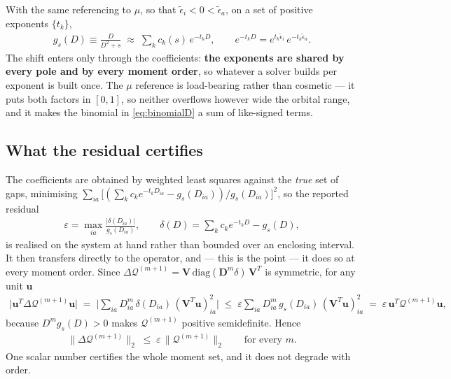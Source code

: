 \documentclass[11pt]{article}
\newcommand{\mat}[1]{{\mathbf{#1}}}
\newcommand{\Qcal}{\mathcal{Q}}
\newcommand{\eb}{\tilde{\epsilon}}
\begin{document}
With the same referencing to $\mu$, so that $\eb_i < 0 < \eb_a$, on a set of positive
exponents $\{t_k\}$,
\begin{align}
    g_s(D) \equiv \frac{D}{D^2+s} \; \approx \; \sum_k c_k(s)\, e^{-t_k D} ,
    \qquad
    e^{-t_k D} = e^{t_k \eb_i}\, e^{-t_k \eb_a} .
    \label{eq:expfit}
\end{align}
The shift enters only through the coefficients: \textbf{the exponents are shared by every
pole and by every moment order}, so whatever a solver builds per exponent is built once.
The $\mu$ reference is load-bearing rather than cosmetic --- it puts both factors in
$[0,1]$, so neither overflows however wide the orbital range, and it makes the binomial in
\eqref{eq:binomialD} a sum of like-signed terms.

\subsection{What the residual certifies}

The coefficients are obtained by weighted least squares against the \emph{true} set of gaps,
minimising $\sum_{ia} \big[(\sum_k c_k e^{-t_k D_{ia}} - g_s(D_{ia}))/g_s(D_{ia})\big]^2$, so
the reported residual
\begin{align}
    \varepsilon = \max_{ia} \frac{|\delta(D_{ia})|}{g_s(D_{ia})} ,
    \qquad
    \delta(D) = \sum_k c_k e^{-t_k D} - g_s(D) ,
\end{align}
is realised on the system at hand rather than bounded over an enclosing interval. It then
transfers directly to the operator, and --- this is the point --- it does so at every moment
order. Since $\Delta \Qcal^{(m+1)} = \mat{V}\,\mathrm{diag}(\mat{D}^m \delta)\,\mat{V}^T$ is
symmetric, for any unit $\mat{u}$
\begin{align}
    \big| \mat{u}^T \Delta \Qcal^{(m+1)} \mat{u} \big|
    \;=\; \Big| \sum_{ia} D_{ia}^m\, \delta(D_{ia})\, (\mat{V}^T\mat{u})_{ia}^2 \Big|
    \;\le\; \varepsilon \sum_{ia} D_{ia}^m\, g_s(D_{ia})\, (\mat{V}^T\mat{u})_{ia}^2
    \;=\; \varepsilon\, \mat{u}^T \Qcal^{(m+1)} \mat{u} ,
\end{align}
because $D^m g_s(D) > 0$ makes $\Qcal^{(m+1)}$ positive semidefinite. Hence
\begin{align}
    \big\| \Delta \Qcal^{(m+1)} \big\|_2 \;\le\; \varepsilon\, \big\| \Qcal^{(m+1)} \big\|_2
    \qquad \text{for every } m .
    \label{eq:bound}
\end{align}
One scalar number certifies the whole moment set, and it does not degrade with order.
\end{document}
